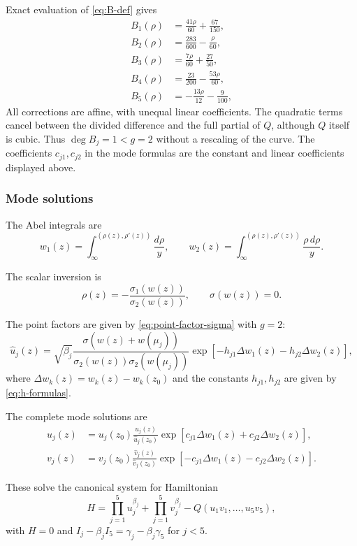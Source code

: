 \documentclass[11pt]{article}
\begin{document}
Exact evaluation of \eqref{eq:B-def} gives
\begin{align}
B_1(\rho)&=\frac{41 \rho}{60} + \frac{67}{150},\label{ex:g2-B1}\\
B_2(\rho)&=\frac{283}{600} - \frac{\rho}{60},\label{ex:g2-B2}\\
B_3(\rho)&=\frac{7 \rho}{60} + \frac{27}{50},\label{ex:g2-B3}\\
B_4(\rho)&=\frac{23}{200} - \frac{53 \rho}{60},\label{ex:g2-B4}\\
B_5(\rho)&=- \frac{13 \rho}{12} - \frac{9}{100},\label{ex:g2-B5}
\end{align}
All corrections are affine, with unequal linear coefficients. The quadratic terms cancel between the divided difference and the full partial of $Q$, although $Q$ itself is cubic. Thus $\deg B_j=1<g=2$ without a rescaling of the curve. The coefficients $c_{j1},c_{j2}$ in the mode formulas are the constant and linear coefficients displayed above.

\subsubsection{Mode solutions}

The Abel integrals are
\[
w_1(z) = \int_\infty^{(\rho(z),\rho'(z))}\frac{d\rho}{y}, \qquad
w_2(z) = \int_\infty^{(\rho(z),\rho'(z))}\frac{\rho\,d\rho}{y}.
\]

The scalar inversion is
\[
\rho(z) = -\frac{\sigma_1(w(z))}{\sigma_2(w(z))}, \qquad \sigma(w(z)) = 0.
\]

The point factors are given by \eqref{eq:point-factor-sigma} with $g=2$:
\[
\widehat{u}_j(z) = \sqrt{\beta_j}\frac{\sigma(w(z)+w(\mu_j))}{\sigma_2(w(z))\sigma_2(w(\mu_j))}\exp\!\left[-h_{j1}\Delta w_1(z) - h_{j2}\Delta w_2(z)\right],
\]
where $\Delta w_k(z) = w_k(z) - w_k(z_0)$ and the constants $h_{j1}, h_{j2}$ are given by \eqref{eq:h-formulas}.

The complete mode solutions are
\begin{equation}\label{ex:g2-modes}
\begin{aligned}
u_j(z) &= u_j(z_0)\frac{\widehat{u}_j(z)}{\widehat{u}_j(z_0)}\exp\!\left[c_{j1}\Delta w_1(z) + c_{j2}\Delta w_2(z)\right],\\
v_j(z) &= v_j(z_0)\frac{\widehat{v}_j(z)}{\widehat{v}_j(z_0)}\exp\!\left[-c_{j1}\Delta w_1(z) - c_{j2}\Delta w_2(z)\right].
\end{aligned}
\end{equation}

These solve the canonical system for Hamiltonian
\[
H = \prod_{j=1}^{5} u_j^{\beta_j} + \prod_{j=1}^{5} v_j^{\beta_j} - Q(u_1v_1,\ldots,u_5v_5),
\]
with $H=0$ and $I_j-\beta_j I_5=\gamma_j-\beta_j\gamma_5$ for $j<5$.
\end{document}
